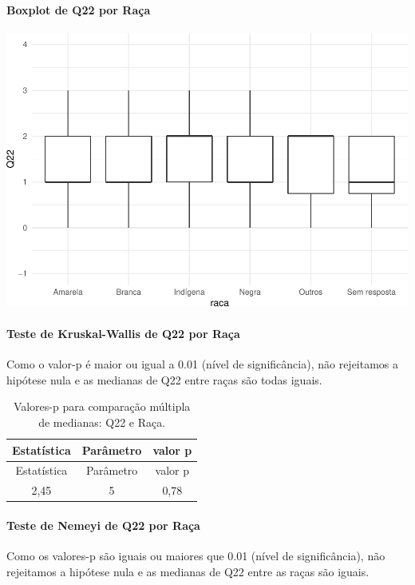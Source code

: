 \documentclass[]{article}
\let\oldparagraph\paragraph
\renewcommand{\paragraph}[1]{\oldparagraph{#1}\mbox{}}
\begin{document}
\hypertarget{boxplot-de-q22-por-rauxe7a}{%
\paragraph{Boxplot de Q22 por Raça}\label{boxplot-de-q22-por-rauxe7a}}

\begin{center}\includegraphics[width=0.75\linewidth]{relatorio_covid19_files/figure-latex/unnamed-chunk-520-1} \end{center}

\hypertarget{teste-de-kruskal-wallis-de-q22-por-rauxe7a}{%
\paragraph{Teste de Kruskal-Wallis de Q22 por Raça}\label{teste-de-kruskal-wallis-de-q22-por-rauxe7a}}

Como o valor-p é maior ou igual a 0.01 (nível de significância), não rejeitamos a hipótese nula e as medianas de Q22 entre raças são todas iguais.

\begin{longtable}[]{@{}ccc@{}}
\caption{\label{tab:unnamed-chunk-522}Valores-p para comparação múltipla de medianas: Q22 e Raça.}\tabularnewline
\toprule
Estatística & Parâmetro & valor p\tabularnewline
\midrule
\endfirsthead
\toprule
Estatística & Parâmetro & valor p\tabularnewline
\midrule
\endhead
2,45 & 5 & 0,78\tabularnewline
\bottomrule
\end{longtable}

\hypertarget{teste-de-nemeyi-de-q22-por-rauxe7a}{%
\paragraph{Teste de Nemeyi de Q22 por Raça}\label{teste-de-nemeyi-de-q22-por-rauxe7a}}

Como os valores-p são iguais ou maiores que 0.01 (nível de significância), não rejeitamos a hipótese nula e as medianas de Q22 entre as raças são iguais.
\end{document}
